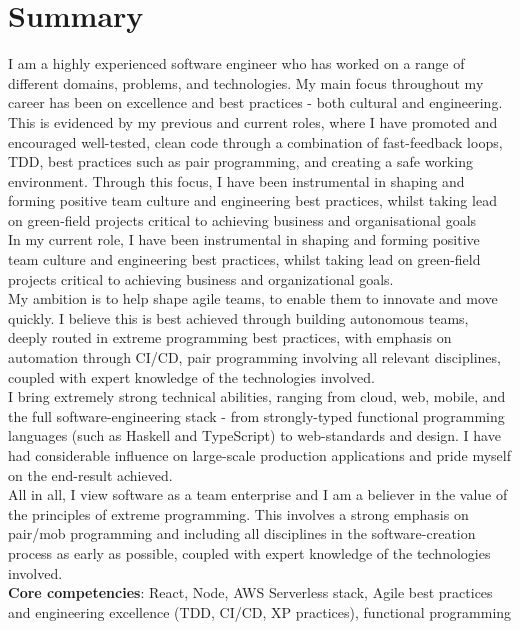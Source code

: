 \section{Summary}

I am a highly experienced software engineer who has worked on a range of different domains, problems, and technologies. My main focus throughout my career has been on excellence and best practices - both cultural and engineering.\\

This is evidenced by my previous and current roles, where I have promoted and encouraged well-tested, clean code through a combination of fast-feedback loops, TDD, best practices such as pair programming, and creating a safe working environment. Through this focus, I have been instrumental in shaping and forming positive team culture and engineering best practices, whilst taking lead on green-field projects critical to achieving business and organisational goals\\

In my current role, I have been instrumental in shaping and forming positive team culture and engineering best practices, whilst taking lead on green-field projects critical to achieving business and organizational goals.\\

My ambition is to help shape agile teams, to enable them to innovate and move quickly. I believe this is best achieved through building autonomous teams, deeply routed in extreme programming best practices, with emphasis on automation through CI/CD, pair programming involving all relevant disciplines, coupled with expert knowledge of the technologies involved.\\

I bring extremely strong technical abilities, ranging from cloud, web, mobile, and the full software-engineering stack - from strongly-typed functional programming languages (such as Haskell and TypeScript) to web-standards and design. I have had considerable influence on large-scale production applications and pride myself on the end-result achieved.\\

All in all, I view software as a team enterprise and I am a believer in the value of the principles of extreme programming. This involves a strong emphasis on pair/mob programming and including all disciplines in the software-creation process as early as possible, coupled with expert knowledge of the technologies involved.\\

\textbf{Core competencies}: React, Node, AWS Serverless stack, Agile best practices and engineering excellence (TDD, CI/CD, XP practices), functional programming

